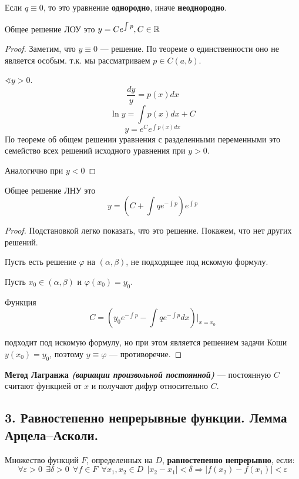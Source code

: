 Если \(q\equiv 0\), то это уравнение \textbf{однородно}, иначе \textbf{неоднородно}.

Общее решение ЛОУ это \(y = Ce^{\int p}, C\in\mathbb{R}\)

\begin{proof}
    Заметим, что \(y\equiv 0\) --- решение. По теореме о единственности оно не является особым. т.к. мы рассматриваем \(p\in C(a, b)\).

    \(\sphericalangle y > 0\).
    \[\frac{dy}{y} = p(x)dx\]
    \[\ln y = \int p(x)dx + C\]
    \[y = e^C e^{\int p(x)dx}\]
    По теореме об общем решении уравнения с разделенными переменными это семейство всех решений исходного уравнения при \(y > 0\).

    Аналогично при \(y < 0\)
\end{proof}

Общее решение ЛНУ это
\[y = \left( C + \int qe^{ -\int p} \right)e^{\int p}\]
\begin{proof}
    Подстановкой легко показать, что это решение. Покажем, что нет других решений.

    Пусть есть решение \(\varphi\) на \((\alpha, \beta)\), не подходящее под искомую формулу.

    Пусть \(x_0 \in (\alpha,\beta)\) и \(\varphi(x_0) = y_0\).

    Функция
    \[C = \left( y_0 e^{ -\int p} - \int q e^{ -\int p} dx\right)\Bigg|_{x = x_0}\]

    подходит под искомую формулу, но при этом является решением задачи Коши \(y(x_0) = y_0\), поэтому \(y \equiv \varphi\) --- противоречие.
\end{proof}

\textbf{Метод Лагранжа \textit{(вариации произвольной постоянной)}} --- постоянную \(C\) считают функцией от \(x\) и получают дифур относительно \(C\).

\subsection*{3. Равностепенно непрерывные функции. Лемма Арцела–Асколи.}

Множество функций \(F \), определенных на \(D\), \textbf{равностепенно непрерывно}, если:
\[\forall \varepsilon > 0 \ \ \exists \delta > 0 \ \ \forall f\in F \ \ \forall x_1, x_2\in D \ \ |x_2 - x_1|< \delta \Rightarrow |f(x_2) - f(x_1)|< \varepsilon\]

